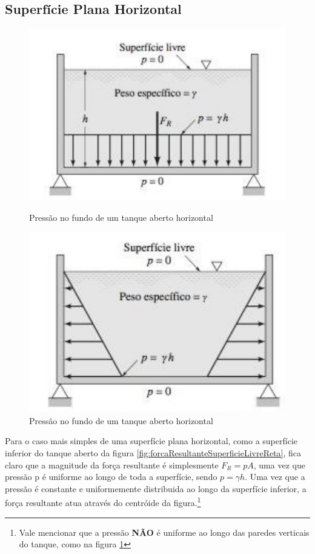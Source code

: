 \documentclass{article}
\begin{document}
\subsection{Superfície Plana Horizontal}
\begin{figure}[h]
  \centering
  \begin{minipage}{0.45\textwidth}
    \centering
    \includegraphics[width=0.8\linewidth]{forcaResultanteSuperficieLivreReta.png}
    \caption{Pressão no fundo de um tanque aberto horizontal}
    \label{fig:forcaResultanteSuperficieLivreReta}
  \end{minipage}\hfill
  \begin{minipage}{0.45\textwidth}
    \centering
    \includegraphics[width=0.8\linewidth]{forcaResultanteSuperficiePlanaParedes.png}
    \caption{Pressão no fundo de um tanque aberto horizontal}
    \label{fig:forcaResultanteSuperficieLivreRetaParedes}
  \end{minipage}
\end{figure}

Para o caso mais simples de uma superfície plana horizontal, como a superfície inferior do tanque aberto da figura \ref{fig:forcaResultanteSuperficieLivreReta}, fica claro que a magnitude da força resultante é simplesmente $F_R=pA$, uma vez que pressão p é uniforme ao longo de toda a superfície, sendo $p= \gamma h$. Uma vez que a pressão é constante e uniformemente distribuida ao longo da superfície inferior, a força resultante atua através do centróide da figura.\footnote{Vale mencionar que a pressão \textbf{NÃO} é uniforme ao longo das paredes verticais do tanque, como na figura \ref{fig:forcaResultanteSuperficieLivreRetaParedes}}
\newpage
\end{document}
